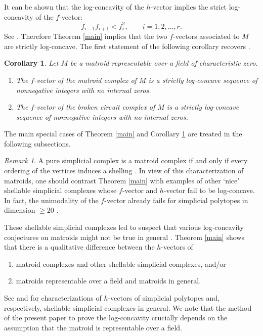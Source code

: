 \documentclass{compositio}
\newtheorem{corollary}[theorem]{Corollary}
\theoremstyle{definition}
\theoremstyle{remark}
\newtheorem{remark}[theorem]{Remark}
\begin{document}
It can be shown that the log-concavity of the $h$-vector implies the strict log-concavity of the $f$-vector:
\[
f_{i-1}f_{i+1}<f_i^2, \qquad i=1,2,\ldots,r.
\]
See  \cite[Lemma 5.1]{Lenz}. Therefore Theorem \ref{main} implies that the two $f$-vectors associated to $M$ are strictly log-concave.
The first statement of the following corollary recovers \cite[Theorem 1.1]{Lenz}.

\begin{corollary}\label{f-vector}
Let $M$ be a matroid representable over a field of characteristic zero.
\begin{enumerate}
\item  The $f$-vector of the matroid complex of $M$ is a strictly log-concave sequence of nonnegative integers with no internal zeros.
\item The $f$-vector of the broken circuit complex of $M$ is a strictly log-concave sequence of nonnegative integers with no internal zeros.
\end{enumerate}
\end{corollary}

The main special cases of Theorem \ref{main} and Corollary \ref{f-vector} are treated in the following subsections.

\begin{remark}
A pure simplicial complex is a matroid complex if and only if every ordering of the vertices induces a shelling \cite[Theorem 7.3.4]{Bjorner3}. 
In view of this characterization of matroids, one should contrast Theorem \ref{main} with examples of other `nice' shellable simplicial complexes whose $f$-vector and $h$-vector fail to be log-concave. In fact, the unimodality of the $f$-vector already fails for simplicial polytopes in dimension $\ge 20$ \cite{Billera-Lee,Bjorner1}. 

These shellable simplicial complexes led to suspect that various log-concavity conjectures on matroids might not be true in general \cite{Stanley00,Wagner}.
Theorem \ref{main} shows that there is a qualitative difference between the $h$-vectors of
\begin{enumerate}[1.]
\item matroid complexes and other shellable simplicial complexes, and/or 
\item matroids representable over a field and matroids in general.
\end{enumerate}
See \cite{Stan} and \cite{StanCM} for characterizations of $h$-vectors of simplicial polytopes and, respectively, shellable simplicial complexes in general. We note that the method of the present paper to prove the log-concavity crucially depends on the assumption that the matroid is representable over a field.
\end{remark}
\end{document}
